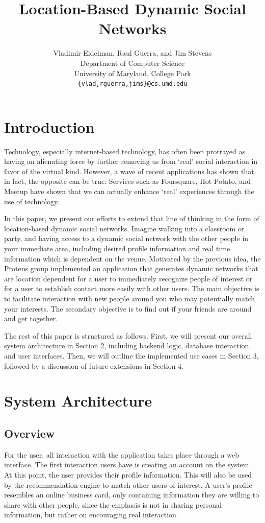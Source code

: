 \documentclass[11pt]{article}
\title{Location-Based Dynamic Social Networks}
\author{
   Vladimir Eidelman, Raul Guerra, and Jim Stevens\\
Department of Computer Science \\
University of Maryland, College Park\\
 { \tt \{vlad,rguerra,jims\}@cs.umd.edu}
}
\begin{document}
\maketitle 

\section{Introduction}


Technology, especially internet-based technology, has often been protrayed as having an alienating force by further removing us from `real' social interaction in favor of the virtual kind. However, a wave of recent applications has shown that in fact, the opposite can be true. Services such as Foursquare, Hot Potato, and Meetup have shown that we can actually enhance `real' experiences through the use of technology. 

In this paper, we present our efforts to extend that line of thinking in the form of location-based dynamic social networks. Imagine walking into a classroom or party, and having access to a dynamic social network with the other people in your immediate area, including desired profile information and real time information which is dependent on the venue. Motivated by the previous idea, the Proteus group implemented an application that generates dynamic networks that are location dependent for a user to immediately recognize people of interest or for a user to establish contact more easily with other users. The main objective is to facilitate interaction with new people around you who may potentially match your interests. The secondary objective is to find out if your friends are around and get together. 

The rest of this paper is structured as follows. First, we will present our overall system architecture in Section 2, including backend logic, database interaction, and user interfaces. Then, we will outline the implemented use cases in Section 3, followed by a discussion of future extensions in Section 4.


\section{System Architecture}

\subsection{Overview}

For the user, all interaction with the application takes place through a web interface. The first interaction users have is creating an account on the system. At this point, the user provides their profile information. This will also be used by the recommendation engine to match other users of interest. A user's profile resembles an online business card, only containing information they are willing to share with other people, since the emphasis is not in sharing personal information, but rather on encouraging real interaction. 
\end{document}
